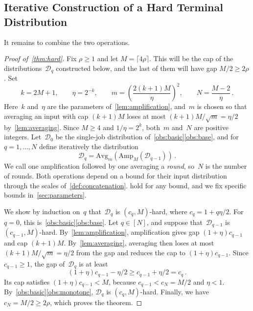\documentclass[11pt,letterpaper]{article}
\theoremstyle{definition}
\theoremstyle{remark}
\newcommand{\cD}{\mathcal{D}}
\newcommand{\Amp}{\mathrm{Amp}}
\newcommand{\Avg}{\mathrm{Avg}}
\begin{document}
\subsection{Iterative Construction of a Hard Terminal Distribution}\label{sec:iteration}

It remains to combine the two operations.

\begin{proof}[Proof of~\cref{thm:hard}]
Fix $\rho\ge1$ and let $M=\lceil4\rho\rceil$. This will be the cap of the distributions~$\cD_q$ constructed below, and the last of them will have gap $M/2\ge2\rho$. Set
\begin{equation*}
  k=2M+1,\qquad \eta=2^{-k},\qquad
  m=\left(\frac{2(k+1)M}{\eta}\right)^2,\qquad
  N=\frac{M-2}{\eta}\,.
\end{equation*}
Here~$k$ and~$\eta$ are the parameters of~\cref{lem:amplification}, and~$m$ is chosen so that averaging an input with cap $(k+1)M$ loses at most $(k+1)M/\sqrt m=\eta/2$ by~\cref{lem:averaging}. Since $M\ge4$ and $1/\eta=2^k$, both~$m$ and~$N$ are positive integers. Let~$\cD_0$ be the single-job distribution of~\cref{obs:basic}\ref{obs:base}, and for $q=1,\dots,N$ define iteratively the distribution
\begin{equation*}
  \cD_q=\Avg_m(\Amp_M(\cD_{q-1}))\,.
\end{equation*}
We call one amplification followed by one averaging a \emph{round}, so~$N$ is the number of rounds. Both operations depend on a bound for their input distribution through the scales of~\cref{def:concatenation}.  hold for any bound, and we fix specific bounds in~\cref{sec:parameters}.

We show by induction on~$q$ that~$\cD_q$ is $(c_q,M)$-hard, where $c_q=1+q\eta/2$. For $q=0$, this is~\cref{obs:basic}\ref{obs:base}. Let $q\in[N]$, and suppose that~$\cD_{q-1}$ is $(c_{q-1},M)$-hard. By~\cref{lem:amplification}, amplification gives gap $(1+\eta)c_{q-1}$ and cap $(k+1)M$. By~\cref{lem:averaging}, averaging then loses at most $(k+1)M/\sqrt m=\eta/2$ from the gap and reduces the cap to $(1+\eta)c_{q-1}$. Since $c_{q-1}\ge1$, the gap of~$\cD_q$ is at least
\begin{equation*}
  (1+\eta)c_{q-1}-\eta/2\ge c_{q-1}+\eta/2=c_q\,.
\end{equation*}
Its cap satisfies $(1+\eta)c_{q-1}<M$, because $c_{q-1}<c_N=M/2$ and $\eta<1$. By~\cref{obs:basic}\ref{obs:monotone}, $\cD_q$ is $(c_q,M)$-hard. Finally, we have $c_N=M/2\ge2\rho$, which proves the theorem.
\end{proof}
\end{document}
